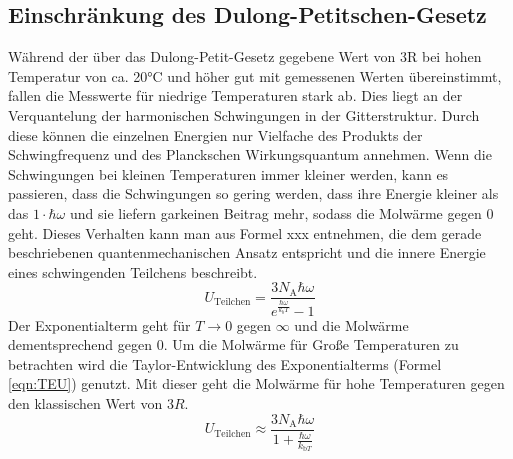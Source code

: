 \documentclass[titlepage = firstcover]{scrartcl}
\begin{document}
        \subsection{Einschränkung des Dulong-Petitschen-Gesetz}
            Während der über das Dulong-Petit-Gesetz gegebene Wert von 3R bei hohen Temperatur von ca. 20°C und höher gut mit gemessenen Werten übereinstimmt,
            fallen die Messwerte für niedrige Temperaturen stark ab. Dies liegt an der Verquantelung der harmonischen Schwingungen in der Gitterstruktur. 
            Durch diese können die einzelnen Energien nur Vielfache des Produkts der Schwingfrequenz und des Planckschen Wirkungsquantum annehmen. Wenn 
            die Schwingungen bei kleinen Temperaturen immer kleiner werden, kann es passieren, dass die Schwingungen so gering werden, dass ihre Energie
            kleiner als das $1 \cdot \hbar \omega$ und sie liefern garkeinen Beitrag mehr, sodass die Molwärme gegen 0 geht. Dieses Verhalten kann man aus Formel
            xxx entnehmen, die dem gerade beschriebenen quantenmechanischen Ansatz entspricht und die innere Energie eines schwingenden Teilchens beschreibt.
            \begin{equation}
              U_{\text{Teilchen}} = \frac{3 N_{\text{A}} \hbar \omega}{e^{\frac{\hbar \omega}{k_bT}}-1}
              \label{eqn:QU}
            \end{equation} 
            Der Exponentialterm geht für $T \rightarrow 0$ gegen $\infty$ und die Molwärme dementsprechend gegen 0. Um die Molwärme für Große Temperaturen
            zu betrachten wird die Taylor-Entwicklung des Exponentialterms (Formel \eqref{eqn:TEU}) genutzt. Mit dieser geht die Molwärme für hohe Temperaturen gegen 
            den klassischen Wert von $3R$.
            \begin{equation}
              U_{\text{Teilchen}} \approx \frac{3 N_{\text{A}} \hbar \omega}{1 + \frac{\hbar \omega}{k_{\text{b}T}}}
              \label{eqn:TEU}
            \end{equation} 

    \newpage
\end{document}
